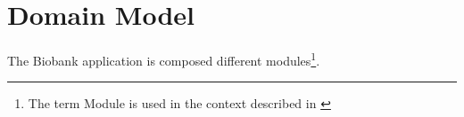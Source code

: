 \chapter{Domain Model}

The Biobank application is composed different modules\footnote{The term Module is used in
the context described in \cite{vernon2013implementing}}.
